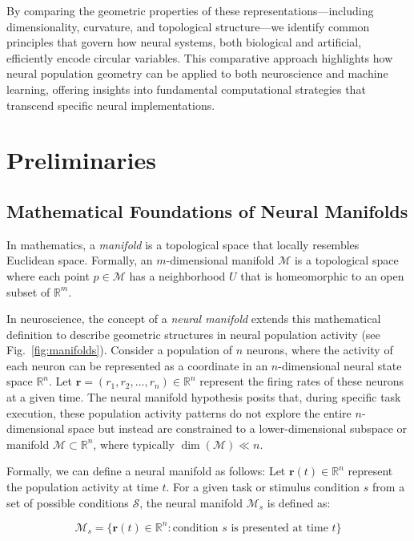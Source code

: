 \documentclass[11pt,a4paper]{article}
\begin{document}
By comparing the geometric properties of these representations---including dimensionality, curvature, and topological structure---we identify common principles that govern how neural systems, both biological and artificial, efficiently encode circular variables. This comparative approach highlights how neural population geometry can be applied to both neuroscience and machine learning, offering insights into fundamental computational strategies that transcend specific neural implementations.

\section{Preliminaries}

\subsection{Mathematical Foundations of Neural Manifolds}

In mathematics, a \textit{manifold} is a topological space that locally resembles Euclidean space. Formally, an $m$-dimensional manifold $\mathcal{M}$ is a topological space where each point $p \in \mathcal{M}$ has a neighborhood $U$ that is homeomorphic to an open subset of $\mathbb{R}^m$. 

In neuroscience, the concept of a \textit{neural manifold} extends this mathematical definition to describe geometric structures in neural population activity (see Fig.~\ref{fig:manifolds}). Consider a population of $n$ neurons, where the activity of each neuron can be represented as a coordinate in an $n$-dimensional neural state space $\mathbb{R}^n$. Let $\mathbf{r} = (r_1, r_2, \ldots, r_n) \in \mathbb{R}^n$ represent the firing rates of these neurons at a given time. The neural manifold hypothesis posits that, during specific task execution, these population activity patterns do not explore the entire $n$-dimensional space but instead are constrained to a lower-dimensional subspace or manifold $\mathcal{M} \subset \mathbb{R}^n$, where typically $\dim(\mathcal{M}) \ll n$.

Formally, we can define a neural manifold as follows: Let $\mathbf{r}(t) \in \mathbb{R}^n$ represent the population activity at time $t$. For a given task or stimulus condition $s$ from a set of possible conditions $\mathcal{S}$, the neural manifold $\mathcal{M}_s$ is defined as:

\begin{equation}
\mathcal{M}_s = \{\mathbf{r}(t) \in \mathbb{R}^n : \text{condition } s \text{ is presented at time } t\}
\end{equation}
\end{document}
